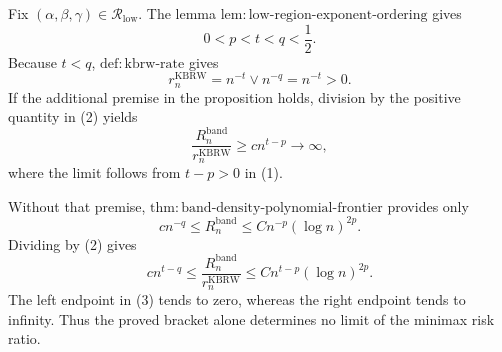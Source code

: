 Fix \((\alpha,\beta,\gamma)\in\mathcal R_{\mathrm{low}}\).  The lemma
\(\mathrm{lem:low\mbox{-}region\mbox{-}exponent\mbox{-}ordering}\) gives
\[
0<p<t<q<\frac12.
\tag{1}
\]
Because \(t<q\), \(\mathrm{def:kbrw\mbox{-}rate}\) gives
\[
r_n^{\mathrm{KBRW}}=n^{-t}\vee n^{-q}=n^{-t}>0.
\tag{2}
\]
If the additional premise in the proposition holds, division by the positive
quantity in (2) yields
\[
\frac{R_n^{\mathrm{band}}}{r_n^{\mathrm{KBRW}}}
\geq c n^{t-p}\longrightarrow\infty,
\]
where the limit follows from \(t-p>0\) in (1).

Without that premise,
\(\mathrm{thm:band\mbox{-}density\mbox{-}polynomial\mbox{-}frontier}\)
provides only
\[
c n^{-q}\leq R_n^{\mathrm{band}}
\leq Cn^{-p}(\log n)^{2p}.
\]
Dividing by (2) gives
\[
c n^{t-q}\leq
\frac{R_n^{\mathrm{band}}}{r_n^{\mathrm{KBRW}}}
\leq Cn^{t-p}(\log n)^{2p}.
\tag{3}
\]
The left endpoint in (3) tends to zero, whereas the right endpoint tends to
infinity.  Thus the proved bracket alone determines no limit of the minimax
risk ratio.